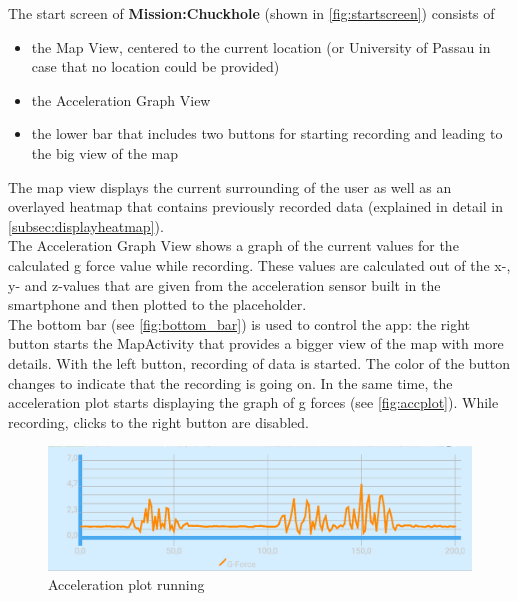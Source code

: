 \documentclass[10pt,a4paper]{article} %
\begin{document}
	The start screen of \textbf{Mission:Chuckhole} (shown in \autoref{fig:startscreen}) consists of 			
		\begin{itemize}
			\item the Map View, centered to the current location (or University of Passau in case that no location could be provided)
			\item the Acceleration Graph View
			\item the lower bar that includes two buttons for starting recording and leading to the big view of the map
		\end{itemize}

	\noindent
	The map view displays the current surrounding of the user as well as an overlayed heatmap that contains previously recorded data (explained in detail in \autoref{subsec:displayheatmap}).\\
	The Acceleration Graph View shows a graph of the current values for the calculated g force value while recording. 
	These values are calculated out of the x-, y- and z-values that are given from the acceleration sensor built in the smartphone and then plotted to the placeholder.\\
	The bottom bar (see \autoref{fig:bottom_bar}) is used to control the app: the right button starts the MapActivity that provides a bigger view of the map with more details.
	With the left button, recording of data is started. 
	The color of the button changes to indicate that the recording is going on.
	In the same time, the acceleration plot starts displaying the graph of g forces (see \autoref{fig:accplot}).
	While recording, clicks to the right button are disabled.\\
	
	\begin{figure}[H]
		\begin{center}
 		  \includegraphics[scale=0.4]{img/acc_plot.png}
		  \caption{Acceleration plot running}
		  \label{fig:accplot}
		\end{center}
	\end{figure}

	
\end{document}
